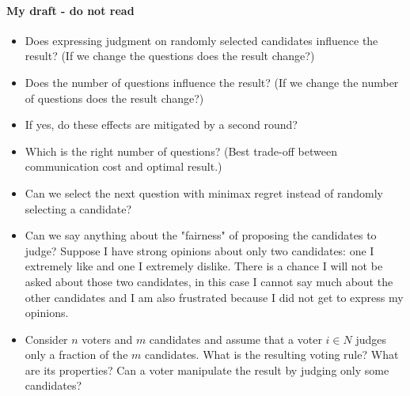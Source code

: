 \documentclass[version=3.21, pagesize, twoside=off, bibliography=totoc, DIV=calc, fontsize=12pt, a4paper]{scrartcl}
\begin{document}
\paragraph{My draft - do not read}
\begin{itemize}
	\item Does expressing judgment on randomly selected candidates influence the result? (If we change the questions does the result change?)
	\item Does the number of questions influence the result? (If we change the number of questions does the result change?)
	\item If yes, do these effects are mitigated by a second round?
	\item Which is the right number of questions? (Best trade-off between communication cost and optimal result.)
	\item Can we select the next question with minimax regret instead of randomly selecting a candidate?
	\item Can we say anything about the "fairness" of proposing the candidates to judge? Suppose I have strong opinions about only two candidates: one I extremely like and one I extremely dislike. There is a chance I will not be asked about those two candidates, in this case I cannot say much about the other candidates and I am also frustrated because I did not get to express my opinions.
	\item Consider $n$ voters and $m$ candidates and assume that a voter $i \in N$ judges only a fraction of the $m$ candidates. What is the resulting voting rule? What are its properties? Can a voter manipulate the result by judging only some candidates? 
\end{itemize}

\newpage

\end{document}
